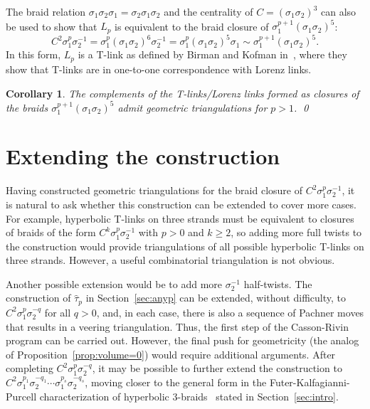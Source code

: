 \documentclass[reqno]{amsart}
\theoremstyle{plain}
\newtheorem{cor}[thm]{Corollary}
\theoremstyle{definition}
\begin{document}
The braid relation $\sigma_1\sigma_2\sigma_1 = \sigma_2\sigma_1\sigma_2 $ and the centrality of $C=(\sigma_1\sigma_2)^{3}$ can also be used to show that $L_p$ is equivalent to the braid closure of $\sigma_1^{p+1}(\sigma_1\sigma_2)^{5}$:
$$
C^2\sigma_1^p\sigma_2^{-1}=\sigma_1^p(\sigma_1\sigma_2)^{6}\sigma_2^{-1}=\sigma_1^p(\sigma_1\sigma_2)^{5}\sigma_1\sim \sigma_1^{p+1}(\sigma_1\sigma_2)^{5}.
$$
In this form, $L_p$ is a T-link as defined by Birman and Kofman in~\cite{TLinks}, where they show that T-links are in one-to-one correspondence with Lorenz links.
\begin{cor}\label{cor:Tlinkstoo}
The complements of the T-links/Lorenz links formed as closures of the braids $\sigma_1^{p+1}(\sigma_1\sigma_2)^{5}$ admit  geometric triangulations for $p>1$. \qed
\end{cor} 


\section{Extending the construction}\label{sec:extendingconstruction}

Having constructed geometric triangulations for the braid closure of $C^2\sigma_1^p\sigma_2^{-1}$, it is natural to ask whether this construction 
can be extended to cover more cases.  For example, hyperbolic T-links on three strands must be equivalent to closures of braids of the form $C^k\sigma_1^p\sigma_2^{-1}$ with $p>0$ and $k\ge2$, so adding more full twists to the construction would provide triangulations of all possible hyperbolic T-links on three strands.  However, a useful combinatorial triangulation is not obvious.

Another possible extension would be to add more $\sigma_2^{-1}$ half-twists.  The construction of $\hat{\tau}_p$ in Section~\ref{sec:anyp} can be extended, without difficulty, to $C^2\sigma_1^p\sigma_2^{-q}$ for all $q>0$, and, in each case, there is also a sequence of Pachner moves that results in a veering triangulation.  Thus, the first step of the Casson-Rivin program can be carried out.  However, the final push for geometricity (the analog of Proposition~\ref{prop:volume=0}) would require additional arguments.  After completing $C^2\sigma_1^p\sigma_2^{-q}$, it may be possible to further extend the construction to  $C^2\sigma_1^{p_1}\sigma_2^{-q_1}\cdots\sigma_1^{p_s}\sigma_2^{-q_s}$, moving closer to the general form in the Futer-Kalfagianni-Purcell characterization of hyperbolic 3-braids~\cite{FareyManifolds} stated in Section~\ref{sec:intro}.
\end{document}
